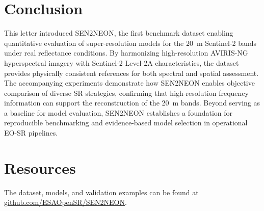 \documentclass[journal]{IEEEtran}
\begin{document}
\section{Conclusion}
This letter introduced SEN2NEON, the first benchmark dataset enabling quantitative evaluation of super-resolution models for the \SI{20}{m} Sentinel-2 bands under real reflectance conditions. By harmonizing high-resolution AVIRIS-NG hyperspectral imagery with Sentinel-2 Level-2A characteristics, the dataset provides physically consistent references for both spectral and spatial assessment. The accompanying experiments demonstrate how SEN2NEON enables objective comparison of diverse SR strategies, confirming that high-resolution frequency information can support the reconstruction of the \SI{20}{m} bands. Beyond serving as a baseline for model evaluation, SEN2NEON establishes a foundation for reproducible benchmarking and evidence-based model selection in operational EO-SR pipelines.

\section*{Resources}
The dataset, models, and validation examples can be found at \url{github.com/ESAOpenSR/SEN2NEON}.







\end{document}

